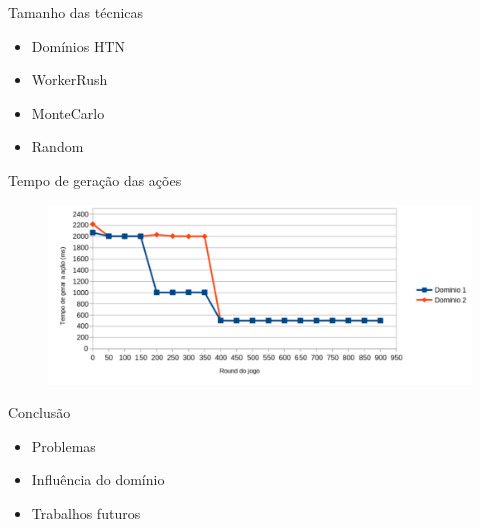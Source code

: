 \documentclass{beamer}
\begin{document}
\begin{frame}{Tamanho das técnicas}
	\begin{itemize}
		\item Domínios HTN
		\item WorkerRush
		\item MonteCarlo
		\item Random
	\end{itemize}
\end{frame}
\begin{frame}{Tempo de geração das ações}
	\begin{figure}[here]
		\includegraphics[width=0.9\linewidth]{fig/graph.pdf}
	\end{figure}
\end{frame}

\begin{frame}{Conclusão}
	\begin{itemize}
		\item Problemas
		\item Influência do domínio
		\item Trabalhos futuros
	\end{itemize}
\end{frame}

\end{document}
